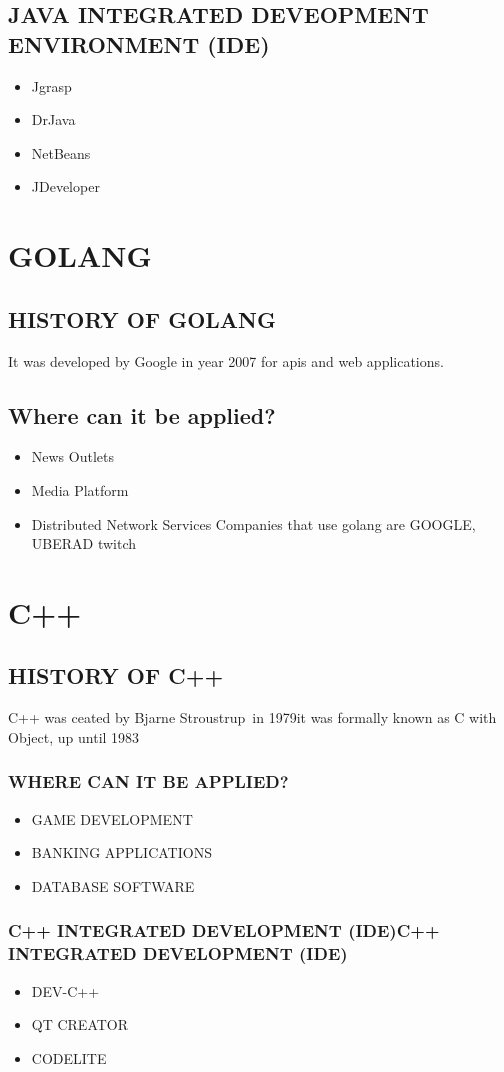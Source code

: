 \documentclass{article}
\begin{document}
\subsection{JAVA INTEGRATED DEVEOPMENT ENVIRONMENT (IDE)}
\begin{itemize}
	\item Jgrasp
	\item DrJava
	\item NetBeans
	\item JDeveloper
\end{itemize}
\section{GOLANG}
\subsection{HISTORY OF GOLANG}
It was developed by Google in year 2007 for apis and web applications.
\subsection{Where can it be applied?}
\begin{itemize}
\item News Outlets
\item Media Platform
\item Distributed Network Services
 Companies that use golang are
GOOGLE, UBERAD twitch
\end{itemize}
\section{C++}
\subsection{HISTORY OF C++}
C++ was ceated by Bjarne Stroustrup in 1979it was formally known as C with Object, up until 1983
\subsubsection{WHERE CAN IT BE APPLIED?}
\begin{itemize}
	\item GAME DEVELOPMENT
	\item BANKING APPLICATIONS
	\item DATABASE SOFTWARE
\end{itemize}
 \subsubsection{C++ INTEGRATED DEVELOPMENT (IDE)C++ INTEGRATED DEVELOPMENT (IDE)}
\begin{itemize}
	\item DEV-C++
	\item QT CREATOR
	\item CODELITE
\end{itemize}

	
	

		
\end{document}
